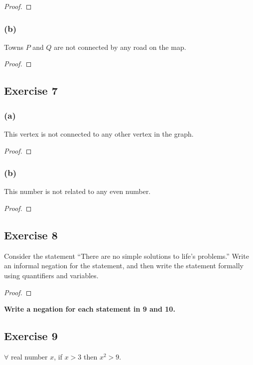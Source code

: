 \documentclass[14pt]{extarticle}
\newcommand{\fa}{\forall}
\begin{document}
\begin{proof}

\end{proof}

\subsubsection{(b)}
Towns $P$ and $Q$ are not connected by any road on the map.

\begin{proof}

\end{proof}

\subsection{Exercise 7}

\subsubsection{(a)}
This vertex is not connected to any other vertex in the graph.

\begin{proof}

\end{proof}

\subsubsection{(b)}
This number is not related to any even number.

\begin{proof}

\end{proof}

\subsection{Exercise 8}
Consider the statement “There are no simple solutions to life’s problems.” Write an informal negation for the statement, and then write the statement formally using quantifiers and variables.

\begin{proof}

\end{proof}

{\bf \color{cyan}Write a negation for each statement in 9 and 10.}

\subsection{Exercise 9}
$\fa$ real number $x$, if $x > 3$ then $x^2 > 9$.
\end{document}
